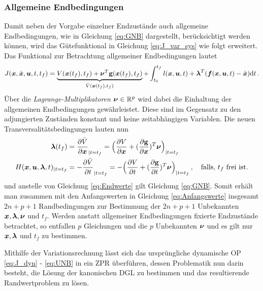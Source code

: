 \subsubsection{Allgemeine Endbedingungen}\label{subsubsec:Allg_Endbedingungen}
Damit neben der Vorgabe einzelner Endzustände auch allgemeine Endbedingungen, wie in Gleichung \eqref{eq:GNB} dargestellt, berücksichtigt werden können, wird das Gütefunktional in Gleichung \eqref{eq:J_var_sys} wie folgt erweitert. Das Funktional zur Betrachtung allgemeiner Endbedingungen lautet
\begin{equation}
J(\boldsymbol{x},\dot{\boldsymbol{x}},\boldsymbol{u},t,t_f) = \underbrace{V(\boldsymbol{x}(t_f),t_f) + \boldsymbol{\nu}^T\mathbf{g}(\boldsymbol{x}(t_f),t_f)}_{\bar{V}(\boldsymbol{x}(t_f),t_f)} + \int_{t_0}^{t_f}l(\boldsymbol{x},\boldsymbol{u},t) + \boldsymbol{\lambda}^T(\boldsymbol{f}(\boldsymbol{x},\boldsymbol{u},t) - \dot{\boldsymbol{x}})\textrm{d}{t}\,. \label{eq:J_var_sys_allgemein}
\end{equation}
Über die \textit{Lagrange-Multiplikatoren} $\boldsymbol{\nu}\in\mathbb{R}^p$ wird dabei die Einhaltung der allgemeinen Endbedingungen gewährleistet. Diese sind im Gegensatz zu den adjungierten Zuständen konstant und keine zeitabhängigen Variablen. Die neuen Transversalitätsbedingungen lauten nun \cite{KnutGraichen.2012}
\begin{align}
\boldsymbol{\lambda}(t_f) &= \frac{\partial \bar{V}}{\partial \boldsymbol{x}}_{|t=t_f} = \Big(\frac{\partial V}{\partial \boldsymbol{x}} + (\frac{\partial \mathbf{g}}{\partial \boldsymbol{x}})^T\boldsymbol{\nu}\Big)_{|t=t_f} \label{eq:Lambdaend_allgemein} \\
H(\boldsymbol{x},\boldsymbol{u},\boldsymbol{\lambda},t)_{|t=t_f} &= - \frac{\partial \bar{V}}{\partial t}_{|t=t_f} = -\Big(\frac{\partial V}{\partial t}+(\frac{\partial \mathbf{g}}{\partial t})^T\boldsymbol{\nu}\Big)_{|t=t_f}\,,\quad \textrm{falls, $t_f$ frei ist.} \label{eq:Transversalitaet_allgemein}
\end{align}
und anstelle von Gleichung \eqref{eq:Endwerte} gilt Gleichung \eqref{eq:GNB}. Somit erhält man zusammen mit den Anfangswerten in Gleichung \eqref{eq:Anfangswerte} insgesamt $2n+p+1$ Randbedingungen zur Bestimmung der $2n+p+1$ Unbekannten $\boldsymbol{x}, \boldsymbol{\lambda}, \boldsymbol{\nu}$ und $t_f$. Werden anstatt allgemeiner Endbedingungen fixierte Endzustände betrachtet, so entfallen $p$ Gleichungen und die $p$ Unbekannten $\boldsymbol{\nu}$ und es gilt nur $\boldsymbol{x}, \boldsymbol{\lambda}$ und $t_f$ zu bestimmen.

Mithilfe der Variationsrechnung lässt sich das ursprüngliche dynamische \gls{OP} \eqref{eq:J_dyn} - \eqref{eq:UNB} in ein \gls{ZPR} überführen, dessen Problematik nun darin besteht, die Lösung der kanonischen \gls{DGL} zu bestimmen und das resultierende Randwertproblem zu lösen. 
